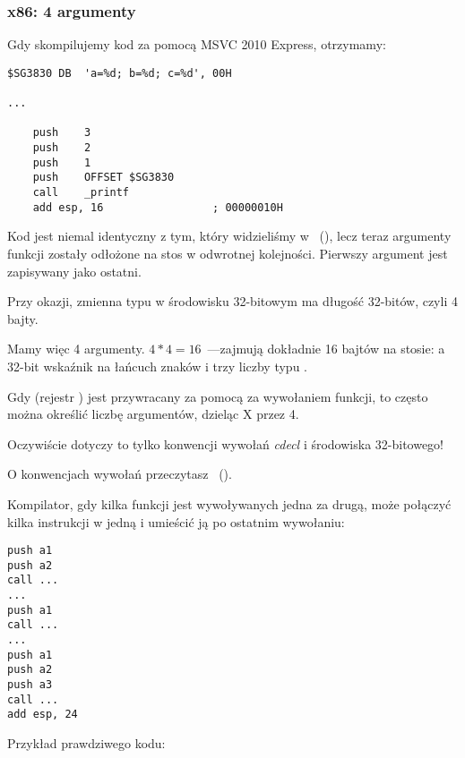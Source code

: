 \subsubsection{x86: 4 argumenty}


Gdy skompilujemy kod za pomocą MSVC 2010 Express, otrzymamy:

\begin{lstlisting}[style=customasmx86]
$SG3830	DB	'a=%d; b=%d; c=%d', 00H

...

	push	3
	push	2
	push	1
	push	OFFSET $SG3830
	call	_printf
	add	esp, 16					; 00000010H
\end{lstlisting}

Kod jest niemal identyczny z tym, który widzieliśmy w \emph{\HelloWorldSectionName}~(), lecz teraz argumenty funkcji \printf zostały odłożone na stos w odwrotnej kolejności. Pierwszy argument jest zapisywany jako ostatni.

Przy okazji, zmienna typu \Tint w środowisku 32-bitowym ma długość 32-bitów, czyli 4 bajty.

Mamy więc 4 argumenty. $4*4 = 16$~---zajmują dokładnie 16 bajtów na stosie: a 32-bit wskaźnik na łańcuch znaków i trzy liczby typu \Tint.

Gdy  (rejestr \ESP) jest przywracany za pomocą  za wywołaniem funkcji, to często można określić liczbę argumentów, dzieląc X przez 4.

Oczywiście dotyczy to tylko konwencji wywołań \emph{cdecl} i środowiska 32-bitowego!

O konwencjach wywołań przeczytasz ~().

Kompilator, gdy kilka funkcji jest wywoływanych jedna za drugą, może połączyć kilka instrukcji  w jedną i umieścić ją po ostatnim wywołaniu:

\begin{lstlisting}[style=customasmx86]
push a1
push a2
call ...
...
push a1
call ...
...
push a1
push a2
push a3
call ...
add esp, 24
\end{lstlisting}

Przykład prawdziwego kodu:



\clearpage
{}
\myindex{\olly}

